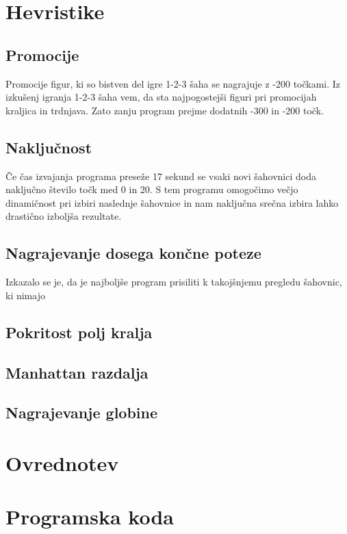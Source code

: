 \documentclass[runningheads]{llncs}
\begin{document}
\section{Hevristike}

\subsection{Promocije}
Promocije figur, ki so bistven del igre 1-2-3 šaha se nagrajuje z -200 točkami. Iz izkušenj igranja 1-2-3 šaha vem, da sta najpogostejši figuri pri promocijah kraljica in trdnjava. Zato zanju program prejme dodatnih -300 in -200 točk.
\subsection{Naključnost}
Če čas izvajanja programa preseže 17 sekund se vsaki novi šahovnici doda naključno število točk med 0 in 20. S tem programu omogočimo večjo dinamičnost pri izbiri naslednje šahovnice in nam naključna srečna izbira lahko drastično izboljša rezultate.
\subsection{Nagrajevanje dosega končne poteze}
Izkazalo se je, da je najboljše program prisiliti k takojšnjemu pregledu šahovnic, ki nimajo 
\subsection{Pokritost polj kralja}
\subsection{Manhattan razdalja}
\subsection{Nagrajevanje globine}

\section{Ovrednotev}

\section{Programska koda}

 
 
 
\end{document}
